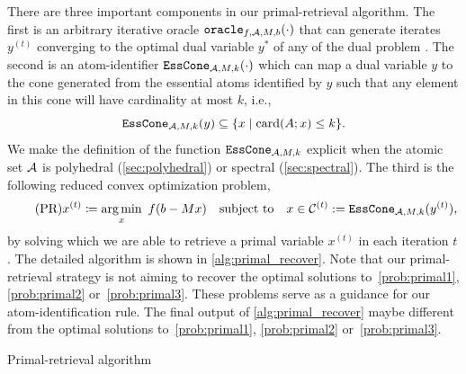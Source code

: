 There are three important components in our primal-retrieval algorithm. The first is an arbitrary iterative oracle $\texttt{oracle}_{f,\mathcal{A},M,b}(\cdot)$ that can generate iterates $y^{(t)}$ converging to the optimal dual variable $y^*$ of any of the dual problem \Drobi. The second is an atom-identifier $\texttt{EssCone}_{\mathcal{A}, M, k}(\cdot)$ which can map a dual variable $y$ to the cone generated from the essential atoms identified by $y$ such that any element in this cone will have cardinality at most $k$, i.e., 
\begin{equation} \label{eq:ess_cone}
  \texttt{EssCone}_{\mathcal{A}, M, k}(y) \subseteq \{x \mid \operatorname{card}(A; x) \leq k\}.
\end{equation}
We make the definition of the function $\texttt{EssCone}_{\mathcal{A}, M, k}$ explicit when the atomic set $\mathcal{A}$ is polyhedral (\autoref{sec:polyhedral}) or spectral (\autoref{sec:spectral}). The third is the following reduced convex optimization problem,  
\begin{equation} \label{eq:primal_recover} \tag{PR}
    x^{(t)} \coloneqq \underset{x}{\textrm{arg}\,{\min}}\enskip f(b - Mx) \hbox{\quad subject to\quad} x \in \mathcal{C}^{(t)} := \texttt{EssCone}_{\mathcal{A}, M, k}(y^{(t)}),
\end{equation}
by solving which we are able to retrieve a primal variable $x^{(t)}$ in each iteration $t$.
The detailed algorithm is shown in \autoref{alg:primal_recover}. Note that our primal-retrieval strategy is not aiming to recover the optimal solutions to~\eqref{prob:primal1}, \eqref{prob:primal2} or~\eqref{prob:primal3}. These problems serve as a guidance for our atom-identification rule. The final output of \autoref{alg:primal_recover} maybe different from the optimal solutions to~\eqref{prob:primal1}, \eqref{prob:primal2} or~\eqref{prob:primal3}. 

\begin{algorithm}[t]
    \DontPrintSemicolon\setcounter{AlgoLine}{-1}
    \caption{Primal-retrieval algorithm} 
    \label{alg:primal_recover}
\end{algorithm}


